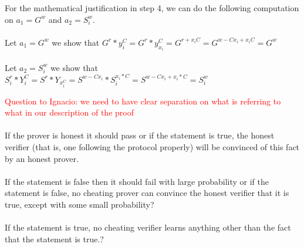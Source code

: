  For the mathematical justification in step 4, we can do the following computation on \begin{math}a_1=G^w\end{math} and \begin{math}a_2=S_i^w\end{math}.\\\\
Let \begin{math}a_1=G^w\end{math} we show that \begin{math}G^r*y_i^C=G^r*y_{x_i}^C=G^{r+x_iC}=G^{w-Cx_i+x_iC}=G^w\end{math}\\\\
Let \begin{math}a_2=S_i^w\end{math} we show that
\begin{math}S_i^r*Y_i^C=S^r*Y_{x_i^C}=S^{w-Cx_i}*S_i^{x_i*C}=S^{w-Cx_i+x_i*C}=S_i^w\end{math}



\begin{infobox}
\textcolor{red}{Question to Ignacio: we need to have clear separation on what is referring to what in our description of the proof}\\\\
 If the prover is honest it should pass or if the statement is true, the honest verifier (that is, one following the protocol properly)
will be convinced of this fact by an honest prover.\\\\
If the statement is false then it should fail with large probability or if the statement is false, no cheating prover can convince
the honest verifier that it is true, except with some small probability?\\\\
 If the statement is true, no cheating verifier learns anything other than the fact that the statement is true.?
\end{infobox}
